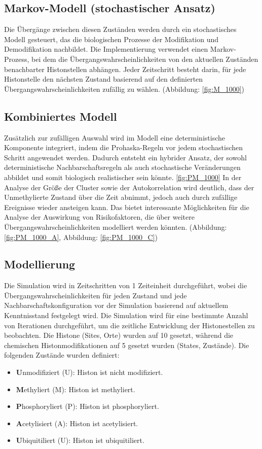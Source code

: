 \documentclass{SeminarV2}
\begin{document}
\subsection{Markov-Modell (stochastischer Ansatz)}
Die \"{U}berg\"{a}nge zwischen diesen Zust\"{a}nden 
werden durch ein stochastisches Modell gesteuert, das die 
biologischen Prozesse der Modifikation und Demodifikation nachbildet. 
Die Implementierung verwendet einen Markov-Prozess, bei dem die 
\"{U}bergangswahrscheinlichkeiten von den aktuellen Zust\"{a}nden benachbarter Histonstellen abh\"{a}ngen.
Jeder Zeitschritt besteht darin, für jede Histonstelle den nächsten Zustand basierend auf den definierten Übergangswahrscheinlichkeiten zufällig zu wählen. (Abbildung: \ref{fig:M_1000})

\subsection{Kombiniertes Modell}
Zusätzlich zur zufälligen Auswahl wird im Modell eine deterministische Komponente integriert, indem die Prohaska-Regeln vor jedem stochastischen Schritt angewendet werden. Dadurch entsteht ein hybrider Ansatz, der sowohl deterministische Nachbarschaftsregeln als auch stochastische Veränderungen abbildet und somit biologisch realistischer sein könnte.
\ref{fig:PM_1000}
In der Analyse der Größe der Cluster sowie der Autokorrelation wird deutlich, dass der Unmethylierte Zustand über die Zeit abnimmt, jedoch auch durch zufällige Ereignisse wieder ansteigen kann.
Das bietet interessante Möglichkeiten für die Analyse der Auswirkung von Risikofaktoren, die über weitere Übergangswahrscheinlichkeiten modelliert werden könnten. (Abbildung: \ref{fig:PM_1000_A}, Abbildung: \ref{fig:PM_1000_C})

\subsection{Modellierung}
Die Simulation wird in Zeitschritten von 1 Zeiteinheit durchgef\"{u}hrt, wobei die \"{U}bergangswahrscheinlichkeiten f\"{u}r jeden Zustand und jede Nachbarschaftskonfiguration 
vor der Simulation basierend auf aktuellem Kenntnisstand festgelegt wird.
Die Simulation wird f\"{u}r eine bestimmte Anzahl von Iterationen durchgef\"{u}hrt, um die zeitliche Entwicklung der Histonestellen zu beobachten.
Die Histone (Sites, Orte) wurden auf 10 gesetzt, während die chemischen Histonmodifikationen auf 5 gesetzt wurden (States, Zustände).
Die folgenden Zust\"{a}nde wurden definiert:
\begin{itemize}
  \item \textbf{U}nmodifiziert (U): Histon ist nicht modifiziert.
  \item \textbf{M}ethyliert (M): Histon ist methyliert.
  \item \textbf{P}hosphoryliert (P): Histon ist phosphoryliert.
  \item \textbf{A}cetylisiert (A): Histon ist acetylisiert.
  \item \textbf{U}biquitiliert (U): Histon ist ubiquitiliert.
\end{itemize}
\end{document}
